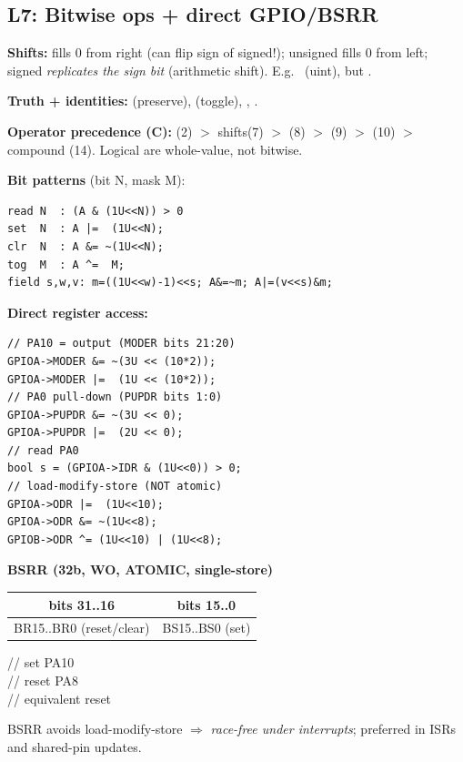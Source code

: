 \subsection{L7: Bitwise ops + direct GPIO/BSRR}
\textbf{Shifts:} \cee{<<} fills 0 from right (can flip sign of signed!); \cee{>>} unsigned fills 0 from left; \cee{>>} signed \emph{replicates the sign bit} (arithmetic shift). E.g.\  (uint), but .

\textbf{Truth + identities:}  (preserve),  (toggle), , .

\textbf{Operator precedence (C):} \cee{\~{}}(2) $>$ shifts(7) $>$ \cee{\&}(8) $>$ \cee{\^{}}(9) $>$ \cee{|}(10) $>$ compound \cee{\&=,\^{}=,|=}(14). Logical \cee{\&\&,||,!} are whole-value, not bitwise.

\textbf{Bit patterns} (bit N, mask M):
\begin{lstlisting}[language={}]
read N  : (A & (1U<<N)) > 0
set  N  : A |=  (1U<<N);
clr  N  : A &= ~(1U<<N);
tog  M  : A ^=  M;
field s,w,v: m=((1U<<w)-1)<<s; A&=~m; A|=(v<<s)&m;
\end{lstlisting}

\textbf{Direct register access:}
\begin{lstlisting}[language={}]
// PA10 = output (MODER bits 21:20)
GPIOA->MODER &= ~(3U << (10*2));
GPIOA->MODER |=  (1U << (10*2));
// PA0 pull-down (PUPDR bits 1:0)
GPIOA->PUPDR &= ~(3U << 0);
GPIOA->PUPDR |=  (2U << 0);
// read PA0
bool s = (GPIOA->IDR & (1U<<0)) > 0;
// load-modify-store (NOT atomic)
GPIOA->ODR |=  (1U<<10);
GPIOA->ODR &= ~(1U<<8);
GPIOB->ODR ^= (1U<<10) | (1U<<8);
\end{lstlisting}

\begin{reg}
\textbf{BSRR (32b, WO, ATOMIC, single-store)}\\
\begin{tabular}{@{}cc@{}}
\toprule
bits 31..16 & bits 15..0 \\
\midrule
BR15..BR0 (reset/clear) & BS15..BS0 (set) \\
\bottomrule
\end{tabular}
\quad // set PA10\\
\; // reset PA8\\
\quad\;  // equivalent reset
\end{reg}
BSRR avoids load-modify-store $\Rightarrow$ \emph{race-free under interrupts}; preferred in ISRs and shared-pin updates.

